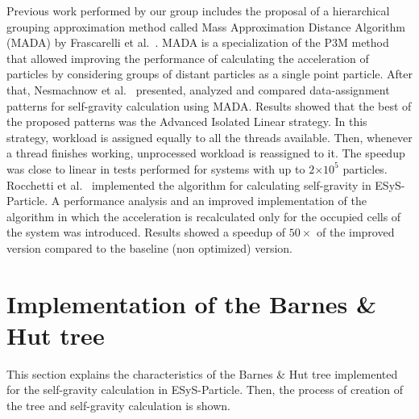 \documentclass[runningheads]{llncs}
\begin{document}
Previous work performed by our group includes the proposal of a hierarchical grouping approximation method called Mass Approximation Distance Algorithm (MADA) by Frascarelli et al.~\cite{frascarelli2014high}. MADA is a specialization of the P3M method that allowed improving the performance of calculating the acceleration of particles by considering groups of distant particles as a single point particle. After that, Nesmachnow et al.~\cite{nesmachnow2015parallel} presented, analyzed and compared data-assignment patterns for self-gravity calculation using MADA. Results showed that the best of the proposed patterns was the Advanced Isolated Linear strategy. In this strategy, workload is assigned equally to all the threads available. Then, whenever a thread finishes working, unprocessed workload is reassigned to it. 
The speedup was close to linear in tests performed for systems with up to $2$$\times$$10^5$ particles. Rocchetti et al.~\cite{rocchetti2017performance} implemented the algorithm for calculating self-gravity in ESyS-Particle. A performance analysis and an improved implementation of the algorithm in which the acceleration is recalculated only for the occupied cells of the system was introduced. Results showed a speedup of $50\times$ of the improved version compared to the baseline (non optimized) version. 

\section{Implementation of the Barnes \& Hut tree}
\label{sec:byh}
This section explains the characteristics of the Barnes \& Hut tree implemented for the self-gravity calculation in ESyS-Particle. Then, the process of creation of the tree and self-gravity calculation is shown.
\end{document}
